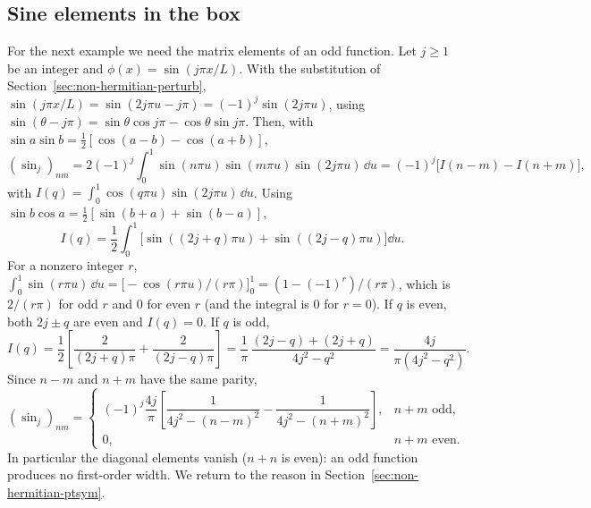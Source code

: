 \subsection{Sine elements in the box}

For the next example we need the matrix elements of an odd function. Let $j\ge1$ be an integer and $\phi(x)=\sin(j\pi x/L)$. With the substitution of Section~\ref{sec:non-hermitian-perturb}, $\sin(j\pi x/L)=\sin(2j\pi u-j\pi)=(-1)^j\sin(2j\pi u)$, using $\sin(\theta-j\pi)=\sin\theta\cos j\pi-\cos\theta\sin j\pi$. Then, with $\sin a\sin b=\tfrac12[\cos(a-b)-\cos(a+b)]$,
\begin{equation}
(\sin_j)_{nm} = 2(-1)^j\int_0^1\sin(n\pi u)\sin(m\pi u)\sin(2j\pi u)\,\dd u
= (-1)^j\bigl[I(n-m)-I(n+m)\bigr],
\end{equation}
with $I(q)=\int_0^1\cos(q\pi u)\sin(2j\pi u)\,\dd u$. Using $\sin b\cos a = \tfrac12[\sin(b+a)+\sin(b-a)]$,
\begin{equation}
I(q) = \frac12\int_0^1\bigl[\sin((2j+q)\pi u)+\sin((2j-q)\pi u)\bigr]\dd u .
\end{equation}
For a nonzero integer $r$, $\int_0^1\sin(r\pi u)\,\dd u = \bigl[-\cos(r\pi u)/(r\pi)\bigr]_0^1 = (1-(-1)^r)/(r\pi)$, which is $2/(r\pi)$ for odd $r$ and 0 for even $r$ (and the integral is 0 for $r=0$). If $q$ is even, both $2j\pm q$ are even and $I(q)=0$. If $q$ is odd,
\begin{equation}
I(q) = \frac12\left[\frac{2}{(2j+q)\pi}+\frac{2}{(2j-q)\pi}\right] = \frac1\pi\,\frac{(2j-q)+(2j+q)}{4j^2-q^2} = \frac{4j}{\pi(4j^2-q^2)} .
\end{equation}
Since $n-m$ and $n+m$ have the same parity,
\begin{equation}
(\sin_j)_{nm} = \begin{cases}(-1)^j\dfrac{4j}{\pi}\left[\dfrac{1}{4j^2-(n-m)^2}-\dfrac{1}{4j^2-(n+m)^2}\right], & n+m \text{ odd},\\[2ex] 0, & n+m\text{ even}.\end{cases}
\label{eq:non-hermitian-sinelem}
\end{equation}
In particular the diagonal elements vanish ($n+n$ is even): an odd function produces no first-order width. We return to the reason in Section~\ref{sec:non-hermitian-ptsym}.

